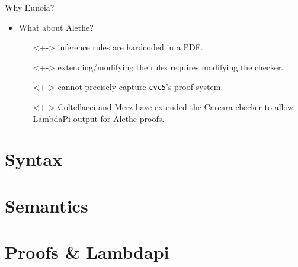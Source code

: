 \documentclass[lualatex, compress, 12pt]{beamer}
\begin{document}
\begin{frame}[fragile]{Why Eunoia?}
	\begin{itemize}
		\item<+-> What about Alethe?
		      \begin{itemize}
			      \item[\emoji{no-entry}]<+-> inference rules are hardcoded in a PDF.
			      \item[\emoji{no-entry}]<+-> extending/modifying the rules requires modifying the checker.
			      \item[\emoji{no-entry}]<+-> cannot precisely capture \texttt{cvc5}'s proof system.
			      \item[\emoji{check-mark-button}]<+->
			            Coltellacci and Merz have extended the Carcara checker
			            to allow LambdaPi output for Alethe proofs.
		      \end{itemize}
	\end{itemize}
\end{frame}

\section{Syntax}



\section{Semantics}


\section{Proofs \& Lambdapi}










\end{document}
